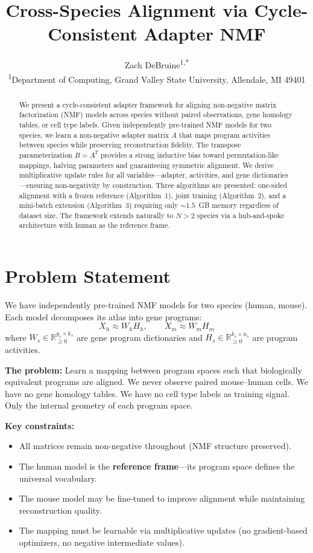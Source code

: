 \documentclass[10pt,twocolumn,letterpaper]{article}
\title{Cross-Species Alignment via Cycle-Consistent Adapter NMF}
\author{
  Zach DeBruine\textsuperscript{1,*}
  \\[6pt]
  \textsuperscript{1}Department of Computing, Grand Valley State University, Allendale, MI 49401
}
\begin{document}
\maketitle
{}

\begin{abstract}
We present a cycle-consistent adapter framework for aligning non-negative
matrix factorization (NMF) models across species without paired observations,
gene homology tables, or cell type labels. Given independently pre-trained NMF
models for two species, we learn a non-negative adapter matrix $A$ that maps
program activities between species while preserving reconstruction fidelity.
The transpose parameterization $B = A^T$ provides a strong inductive bias
toward permutation-like mappings, halving parameters and guaranteeing symmetric
alignment. We derive multiplicative update rules for all variables---adapter,
activities, and gene dictionaries---ensuring non-negativity by construction.
Three algorithms are presented: one-sided alignment with a frozen reference
(Algorithm~1), joint training (Algorithm~2), and a mini-batch extension
(Algorithm~3) requiring only ${\sim}1.5$~GB memory regardless of dataset size.
The framework extends naturally to $N > 2$ species via a hub-and-spoke
architecture with human as the reference frame.
\end{abstract}

\section{Problem Statement}

We have independently pre-trained NMF models for two species (human, mouse).
Each model decomposes its atlas into gene programs:
\begin{equation}
  X_h \approx W_h H_h, \qquad X_m \approx W_m H_m
\end{equation}
where $W_s \in \mathbb{R}_{\geq 0}^{g_s \times k_s}$ are gene program
dictionaries and $H_s \in \mathbb{R}_{\geq 0}^{k_s \times n_s}$ are program
activities.

\textbf{The problem:} Learn a mapping between program spaces such that
biologically equivalent programs are aligned. We never observe paired
mouse--human cells. We have no gene homology tables. We have no cell type
labels as training signal. Only the internal geometry of each program space.

\textbf{Key constraints:}
\begin{itemize}
  \item All matrices remain non-negative throughout (NMF structure preserved).
  \item The human model is the \textbf{reference frame}---its program space
        defines the universal vocabulary.
  \item The mouse model may be fine-tuned to improve alignment while
        maintaining reconstruction quality.
  \item The mapping must be learnable via multiplicative updates (no
        gradient-based optimizers, no negative intermediate values).
\end{itemize}
\end{document}

